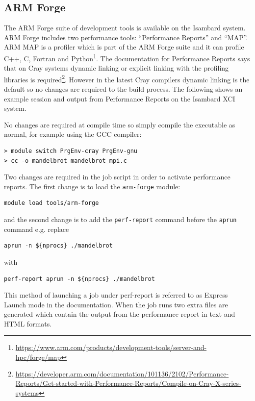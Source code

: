 \documentclass[a4paper,titlepage]{article}
\begin{document}
\pagebreak

\subsection{ARM Forge}

The ARM Forge suite of development tools is available on the Isambard system. ARM Forge includes two performance tools: ``Performance Reports'' and ``MAP''. 
ARM MAP is a profiler which is part of the ARM Forge suite and it can profile C++, C, Fortran and Python\footnote{\url{https://www.arm.com/products/development-tools/server-and-hpc/forge/map}}. The documentation for Performance Reports says that on Cray systems dynamic linking or explicit linking with the profiling libraries is required\footnote{\url{https://developer.arm.com/documentation/101136/2102/Performance-Reports/Get-started-with-Performance-Reports/Compile-on-Cray-X-series-systems}}. However in the latest Cray compilers dynamic linking is the default so no changes are required to the build process. The following shows an example session and output from Performance Reports on the Isambard XCI system.

No changes are required at compile time so simply compile the executable as normal, for example using the GCC compiler:
\begin{verbatim}
> module switch PrgEnv-cray PrgEnv-gnu
> cc -o mandelbrot mandelbrot_mpi.c
\end{verbatim}
Two changes are required in the job script in order to activate performance reports. The first change is to load the \texttt{arm-forge} module:
\begin{verbatim}
module load tools/arm-forge
\end{verbatim}
and the second change is to add the \texttt{perf-report} command before the \texttt{aprun} command e.g. replace
\begin{verbatim}
aprun -n ${nprocs} ./mandelbrot
\end{verbatim}
with
\begin{verbatim}
perf-report aprun -n ${nprocs} ./mandelbrot
\end{verbatim}
This method of launching a job under perf-report is referred to as Express Launch mode in the documentation.
%
When the job runs two extra files are generated which contain the output from the performance report in text and HTML formats. \\
\end{document}
